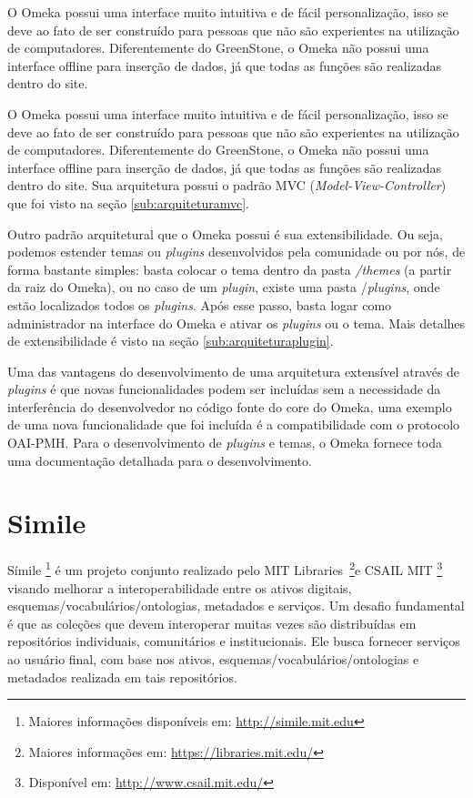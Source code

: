 O Omeka possui uma interface muito intuitiva e de fácil personalização, isso se deve ao fato de ser construído para pessoas que não são experientes na utilização de computadores. Diferentemente do GreenStone, o Omeka não possui uma interface offline para inserção de dados, já que todas as funções são realizadas dentro do site.

O Omeka possui uma interface muito intuitiva e de fácil personalização, isso se deve ao fato de ser construído para pessoas que não são experientes na utilização de computadores. Diferentemente do GreenStone, o Omeka não possui uma interface offline para inserção de dados, já que todas as funções são realizadas dentro do site. Sua arquitetura possui o padrão MVC (\textit{Model-View-Controller}) que foi visto na seção \ref{sub:arquiteturamvc}.

Outro padrão arquitetural que o Omeka possui é sua extensibilidade. Ou seja, podemos estender temas ou \textit{plugins} desenvolvidos pela comunidade ou por nós, de forma bastante simples: basta colocar o tema dentro da pasta \textit{/themes} (a partir da raiz do Omeka), ou no caso de um \textit{plugin}, existe uma pasta /\textit{plugins}, onde estão localizados todos os \textit{plugins}. Após esse passo, basta logar como administrador na interface do Omeka e ativar os \textit{plugins} ou o tema. Mais detalhes de extensibilidade é visto na seção \ref{sub:arquiteturaplugin}.

Uma das vantagens do desenvolvimento de uma arquitetura extensível através de \textit{plugins} é que novas funcionalidades podem ser incluídas sem a necessidade da interferência do desenvolvedor no código fonte do core do Omeka, uma exemplo de uma nova funcionalidade que foi incluída é a compatibilidade com o protocolo OAI-PMH. Para o desenvolvimento de \textit{plugins} e temas, o Omeka fornece toda uma documentação detalhada para o desenvolvimento.

\section*{Simile}

Símile \footnote{Maiores informações disponíveis em: \url{http://simile.mit.edu}} é um projeto conjunto realizado pelo MIT Libraries~\footnote{Maiores informações em: \url{https://libraries.mit.edu/}}e CSAIL MIT \footnote{Disponível em: \url{http://www.csail.mit.edu/}} visando melhorar a interoperabilidade entre os ativos digitais, esquemas/vocabulários/ontologias, metadados e serviços. Um desafio fundamental é que as coleções que devem interoperar muitas vezes são distribuídas em repositórios individuais, comunitários e institucionais. Ele busca fornecer serviços ao usuário final, com base nos ativos, esquemas/vocabulários/ontologias e metadados realizada em tais repositórios. 

